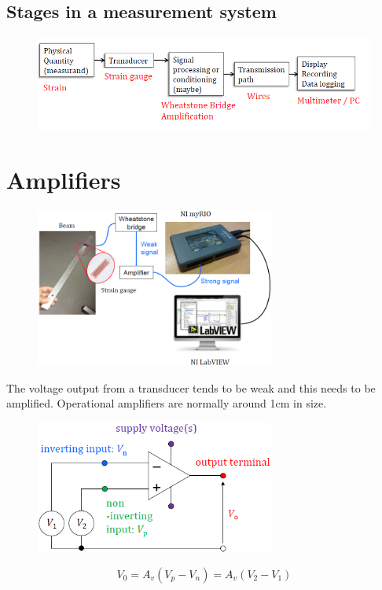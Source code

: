 \documentclass[class=report, crop=false, 12pt,a4paper]{standalone}
\begin{document}
\subsection*{Stages in a measurement system}
\begin{figure}[H]
  \centering
  \includegraphics[width = 0.8 \textwidth]{../img/diagram38.png}
\end{figure}
\section{Amplifiers}
\begin{figure}[H]
  \centering
  \includegraphics[width = 0.7\textwidth]{../img/diagram39.png}
\end{figure}
The voltage output from a transducer tends to be weak and this needs to be amplified. Operational amplifiers are normally around 1\si{\centi\meter} in size.
\begin{figure}[H]
  \centering
  \includegraphics[width = 0.7\textwidth]{../img/diagram40.png}
\end{figure}
\begin{equation}
  V_0 = A_v (V_p - V_n) = A_v (V_2 - V_1)
\end{equation}
\end{document}
